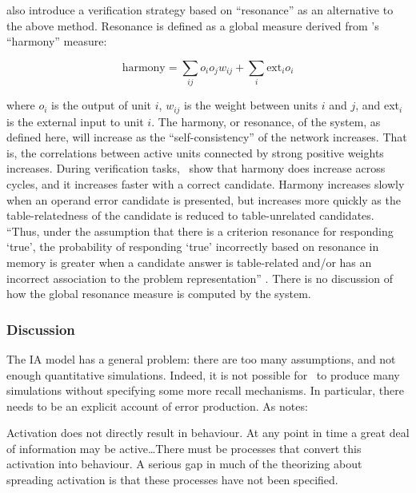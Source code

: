  also introduce a verification strategy based on
``resonance'' as an alternative to the above method.
Resonance is defined as a global measure derived from
\citeauthor{pdp:6}'s \citeyear{pdp:6} ``harmony'' measure:

$$ \mbox{harmony} = \sum\limits_{ij} o_i o_j w_{ij} +
\sum\limits_i \mbox{ext}_i o_i $$


\noindent where $o_i$ is the output of unit $i$, $w_{ij}$ is the weight
between units $i$ and $j$, and ext$_i$ is the external input to unit $i$.
The harmony, or resonance, of the system, as defined here, will increase as
the ``self-consistency'' of the network increases.
That is, the correlations between active units connected
by strong positive weights increases.
During
verification tasks, \citeauthor{rickinte}\
show that harmony does increase
across cycles, and it increases faster with a correct candidate.  Harmony
increases slowly when an operand error candidate is presented, but
increases more quickly as the table-relatedness of the candidate is reduced
to table-unrelated candidates.  ``Thus, under the assumption that there
is a criterion resonance for responding `true', the probability of
responding `true'
incorrectly based on resonance in memory is greater when a
candidate answer is table-related and/or has an incorrect association to
the problem representation'' \cite[p.~28]{rickinte}.  There is no
discussion of how the global resonance measure is computed by the
system.

\subsubsection{Discussion}

The IA model has a general problem: there are too many assumptions, and not
enough quantitative simulations.  Indeed, it is not possible for
\citeauthor{rickinte}\
to produce many simulations without specifying some
more recall mechanisms.  In particular, there needs to be an explicit
account of error production. As  notes:

\begin{ssquote}
Activation does not directly result in behaviour.  At any point in time a
great deal of information may be active\ldots There must be processes that
convert this activation into behaviour.  A serious gap in much of the
theorizing about spreading activation is that these processes have not been
specified.
\end{ssquote}

